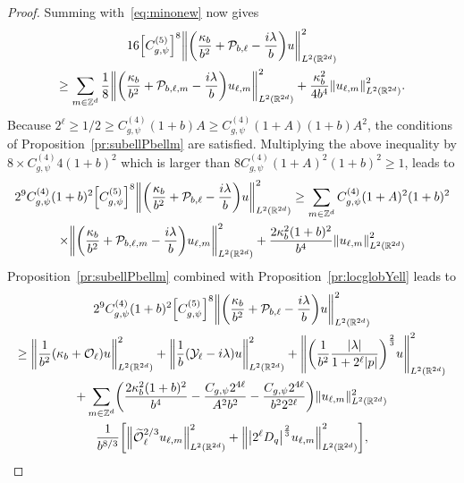 \documentclass[10pt]{amsart}
\theoremstyle{definition}\newtheorem{defi}[theo]{Definition}\newtheorem{rema}[theo]{Remark}\newtheorem{exam}[theo]{Example}\newtheorem{exem}[theo]{Example}\newtheorem{nota}[theo]{Notation}
\newcommand{\Z}{\mathbb{Z}}
\newcommand{\R}{\mathbb{R}}
\newcommand{\clY}{\mathcal{Y}}
\newcommand{\clO}{\mathcal{O}}
\newcommand{\clP}{\mathcal{P}}
\newcommand\norm[1]{\left\lVert#1\right\rVert}
\let\oldtilde\tilde
\renewcommand*{\tilde}[1]{\mathchoice{\widetilde{#1}}{\widetilde{#1}}{\oldtilde{#1}}{\oldtilde{#1}}}
\let\originalleft\left
\let\originalright\right
\renewcommand{\left}{\mathopen{}\mathclose\bgroup\originalleft}
\renewcommand{\right}{\aftergroup\egroup\originalright}
\begin{document}
\begin{proof}
Summing with~\eqref{eq:minonew} now gives
\begin{multline*}
16 \left[C_{g,\psi}^{(5)}\right]^{8} \left\| \left(\frac{\kappa_{b}}{b^{2}}+\clP_{b,\ell} - \frac{i\lambda}{b}\right) u \right\|^{2}_{L^2(\R^{2d})} \\
\geq
\sum_{m\in \Z^d}\frac{1}{8}\left\| \left(\frac{\kappa_{b}}{b^{2}}+\clP_{b,\ell,m} - \frac{i\lambda}{b}\right) u_{\ell,m}\right\|^{2}_{L^2(\R^{2d})}
+\frac{\kappa_{b}^{2}}{4b^4}\norm{u_{\ell,m}}_{L^2(\R^{2d})}^2.
\end{multline*}
Because $2^{\ell}\geq 1/2\geq C_{g,\psi}^{(4)}(1+b)A\geq C_{g,\psi}^{(4)}(1+A)(1+b)A^{2}$, the conditions of Proposition~\ref{pr:subellPbellm} are satisfied. Multiplying the above inequality by $8\times C_{g,\psi}^{(4)}4(1+b)^{2}$ which is larger than $8 C_{g,\psi}^{(4)}(1+A)^{2}(1+b)^{2}\geq 1$, leads to
\begin{multline*}
2^{9} C_{g,\psi}^{(4)}(1+b)^{2}\left[C_{g,\psi}^{(5)}\right]^{8} \left\| \left(\frac{\kappa_{b}}{b^{2}}+\clP_{b,\ell} - \frac{i\lambda}{b}\right) u \right\|^{2}_{L^2(\R^{2d})}
\geq
\sum_{m\in \Z^d}C_{g,\psi}^{(4)}(1+A)^{2}(1+b)^{2}\\\times\left\| \left(\frac{\kappa_{b}}{b^{2}}+\clP_{b,\ell,m} - \frac{i\lambda}{b}\right) u_{\ell,m}\right\|^{2}_{L^2(\R^{2d})}
+\frac{2\kappa_{b}^{2}(1+b)^{2}}{b^4}\norm{u_{\ell,m}}_{L^2(\R^{2d})}^2
\end{multline*}
Proposition~\ref{pr:subellPbellm} combined with Proposition~\ref{pr:locglobYell} leads to
\begingroup
\allowdisplaybreaks
\begin{multline*}
2^{9} C_{g,\psi}^{(4)}(1+b)^{2}\left[C_{g,\psi}^{(5)}\right]^{8} \left\|\left(\frac{\kappa_{b}}{b^{2}}+\clP_{b,\ell} - \frac{i\lambda}{b}\right) u \right\|^{2}_{L^2(\R^{2d})}
\\
\geq\left\|\frac{1}{b^{2}}(\kappa_{b}+\clO_{\ell})u\right\|_{L^{2}(\R^{2d})}^{2} +\left\|\frac{1}{b}(\clY_{\ell}-i\lambda)u\right\|_{L^{2}(\R^{2d})}^{2} +\left\| \left(\frac{1}{b^2} \frac{|\lambda|}{1+2^{\ell}|p|} \right)^{\frac{2}{3}} u \right\|_{L^2(\R^{2d})}^{2}\\
+\sum_{m\in\Z^{d}}\left(\frac{2\kappa_{b}^{2}(1+b)^{2}}{b^{4}} -\frac{C_{g,\psi}2^{4\ell}}{A^{2}b^{2}}-\frac{C_{g,\psi}2^{4\ell}}{b^{2}2^{2\ell}}\right)
\|u_{\ell,m}\|_{L^{2}(\R^{2d})}^{2}
\\
\frac{1}{b^{8/3}}\left[
\left\|\tilde{\clO}_{\ell}^{2/3} u_{\ell,m}\right\|_{L^2(\R^{2d})}^2+ \left\|\left|2^{\ell}D_{q} \right|^{\frac{2}{3}} u_{\ell,m} \right\|_{L^2(\R^{2d})}^{2}\right],
\end{multline*}

\end{proof}
\end{document}
